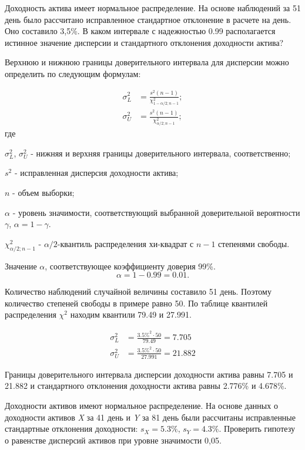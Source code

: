\documentclass[12pt, table, twoside, a4paper]{exam}
\begin{document}
\begin{questions}
\pagebreak
\question[10] Доходность актива имеет нормальное распределение. На основе наблюдений за 51 день было рассчитано исправленное стандартное отклонение в расчете на день. Оно составило 3,5\%. В каком интервале с надежностью 0.99 располагается истинное значение дисперсии и стандартного отклонения доходности актива?

\begin{solution}[8em]
	\raggedright
	Верхнюю и нижнюю границы доверительного интервала для дисперсии можно определить по следующим формулам:
	
	\begin{align}
	\sigma_L^2&=\frac{s^2(n-1)}{\chi_{1-\alpha/2;n-1}^2};\\[8pt]
	\sigma_U^2&=\frac{s^2(n-1)}{\chi_{\alpha/2;n-1}^2};
	\end{align}
	где
	
	$\sigma_L^2$, $\sigma_U^2$ - нижняя и верхняя границы доверительного интервала, соответственно;
	
	$s^2$ - исправленная дисперсия доходности актива;
	
	$n$ - объем выборки;
	
	$\alpha$ - уровень значимости, соответствующий выбранной доверительной вероятности $\gamma$, $\alpha=1-\gamma$. 
	
	$\chi_{\alpha/2;n-1}^2$ - $\alpha/2$-квантиль распределения хи-квадрат с $n-1$ степенями свободы.
	
	Значение $\alpha$, соответствующее коэффициенту доверия 99\%.
	$$\alpha=1-0.99=0.01.$$
	
	Количество наблюдений случайной величины составило 51 день. Поэтому количество степеней свободы в примере равно 50. По таблице квантилей распределения $\chi^2$ находим квантили 79.49 и 27.991.
	
	\begin{align*}
		\sigma^2_L&=\frac{3.5\%^2 \cdot 50}{79.49}=7.705\\
		\sigma^2_U&=\frac{3.5\%^2 \cdot 50}{27.991}=21.882
	\end{align*}
	
	Границы доверительного интервала дисперсии доходности актива равны 7.705 и 21.882 и стандартного отклонения доходности актива равны 2.776\% и 4.678\%.
\end{solution}

\question[10] Доходности активов имеют нормальное распределение. На основе данных о доходности активов \textit{X} за 41 день и \textit{Y} за 81 день были рассчитаны исправленные стандартные отклонения доходности: $s_X=5.3\%$, $s_Y = 4.3\%$. Проверить гипотезу о равенстве дисперсий активов при уровне значимости 0,05.


\end{questions}
\end{document}
